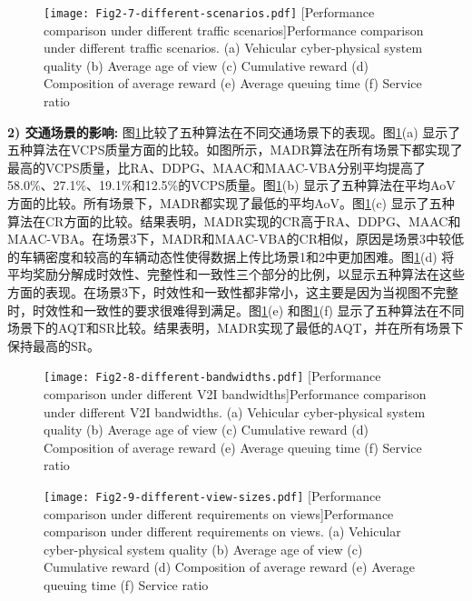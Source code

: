 \begin{figure}[h]
  \centering
  \texttt{[image: Fig2-7-different-scenarios.pdf]}
  [Performance comparison under different traffic scenarios]{Performance comparison under different traffic scenarios. (a) Vehicular cyber-physical system quality (b) Average age of view (c) Cumulative reward (d) Composition of average reward (e) Average queuing time (f) Service ratio}
  \label{fig 2-7}
\end{figure}

\textbf{2) 交通场景的影响:}
图\ref{fig 2-7}比较了五种算法在不同交通场景下的表现。图\ref{fig 2-7}(a) 显示了五种算法在VCPS质量方面的比较。如图所示，MADR算法在所有场景下都实现了最高的VCPS质量，比RA、DDPG、MAAC和MAAC-VBA分别平均提高了58.0\%、27.1\%、19.1\%和12.5\%的VCPS质量。图\ref{fig 2-7}(b) 显示了五种算法在平均AoV方面的比较。所有场景下，MADR都实现了最低的平均AoV。图\ref{fig 2-7}(c) 显示了五种算法在CR方面的比较。结果表明，MADR实现的CR高于RA、DDPG、MAAC和MAAC-VBA。在场景3下，MADR和MAAC-VBA的CR相似，原因是场景3中较低的车辆密度和较高的车辆动态性使得数据上传比场景1和2中更加困难。图\ref{fig 2-7}(d) 将平均奖励分解成时效性、完整性和一致性三个部分的比例，以显示五种算法在这些方面的表现。在场景3下，时效性和一致性都非常小，这主要是因为当视图不完整时，时效性和一致性的要求很难得到满足。图\ref{fig 2-7}(e) 和图\ref{fig 2-7}(f) 显示了五种算法在不同场景下的AQT和SR比较。结果表明，MADR实现了最低的AQT，并在所有场景下保持最高的SR。

\begin{figure}[h]
  \centering
  \texttt{[image: Fig2-8-different-bandwidths.pdf]}
  [Performance comparison under different V2I bandwidths]{Performance comparison under different V2I bandwidths. (a) Vehicular cyber-physical system quality (b) Average age of view (c) Cumulative reward (d) Composition of average reward (e) Average queuing time (f) Service ratio}
  \label{fig 2-8}
\end{figure}

\begin{figure}[h]
  \centering
  \texttt{[image: Fig2-9-different-view-sizes.pdf]}
  [Performance comparison under different requirements on views]{Performance comparison under different requirements on views. (a) Vehicular cyber-physical system quality (b) Average age of view (c) Cumulative reward (d) Composition of average reward (e) Average queuing time (f) Service ratio}
  \label{fig 2-9}
\end{figure}

